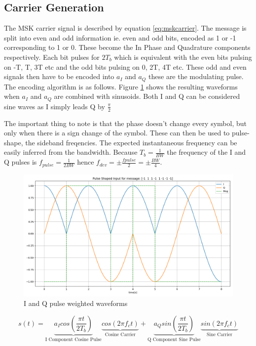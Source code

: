 \subsection{Carrier Generation}
The MSK carrier signal is described by equation \ref{eq:mskcarrier}. The message is split into even and odd information ie. even and odd bits, encoded as 1 or -1 corresponding to 1 or 0. These become the In Phase and Quadrature components respectively. Each bit pulses for $2T_b$ which is equivalent with the even bits pulsing on -T, T, 3T etc and the odd bits pulsing on 0, 2T, 4T etc. These odd and even signals then have to be encoded into $a_I$ and $a_Q$ these are the modulating pulse. The encoding algorithm is as follows. Figure \ref{fig:pulse} shows the resulting waveforms when $a_I$ and $a_Q$ are combined with sinusoids. Both I and Q can be considered sine waves as I simply leads Q by $\frac{\pi}{2}$ 

The important thing to note is that the phase doesn't change every symbol, but only when there is a sign change of the symbol.
These can then be used to pulse-shape, the sideband freqencies. The expected instantaneous frequency can be easily inferred from the bandwidth. Because $T_b = \frac{1}{BW}$ the frequency of the I and Q pulses is $f_{pulse} = \frac{1}{2BW}$ hence $f_{dev} = \pm\frac{f{pulse}}{2}=\pm\frac{BW}{4}$.
\begin{figure}[h!]
    \centering
    \includegraphics[width = \textwidth]{figs/method/pulseshaped.png}
    \caption{I and Q pulse weighted waveforms}
    \label{fig:pulse}
\end{figure}
\begin{equation}
s(t) = \underbrace{a_I cos\left(\frac{\pi t}{2T_b}\right)}_{\text{I Component Cosine Pulse}}\underbrace{cos(2\pi f_ct)}_{\text{Cosine Carrier}} + \underbrace{a_Qsin\left(\frac{\pi t}{2T_b}\right)}_{\text{Q Component Sine Pulse}}\underbrace{sin(2\pi f_ct)}_{\text{Sine Carrier}}
\label{eq:mskcarrier}
\end{equation}


